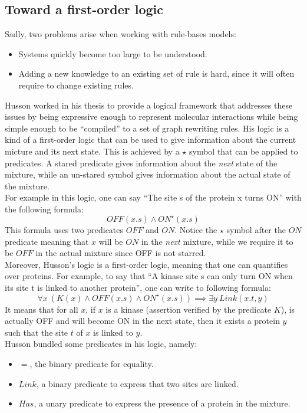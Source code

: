 \documentclass[10pt,a4paper]{article}
\begin{document}
\subsection{Toward a first-order logic}
 Sadly, two problems arise when working with rule-bases models:
\begin{itemize}
\item Systems quickly become too large to be understood.
\item Adding a new knowledge to an existing set of rule is hard, since it will often require to change existing rules.
\end{itemize}

Husson worked in his thesis\cite{husson} to provide a logical framework that addresses these
issues by being expressive enough to represent molecular interactions while being simple enough to be ``compiled'' to a set of graph rewriting rules. His logic is a kind of a first-order logic that can be used to give information about the current micture and its next state. This is achieved by a $\star$ symbol that can be applied to predicates. A stared predicate gives information about the \emph{next} state of the mixture, while an un-stared symbol gives information about the actual state of the mixture.\\

For example in this logic, one can say ``The site s of the protein x turns ON'' with the following formula:
$$ OFF(x.s) \land ON^\star(x.s) $$
This formula uses two predicates $OFF$ and $ON$. Notice the $\star$ symbol after the $ON$ predicate meaning that $x$ will be $ON$ in the \emph{next} mixture, while we require it to be $OFF$ in the actual mixture since OFF is not starred.\\

Moreover, Husson's logic is a first-order logic, meaning that one can quantifies over proteins. For example, to say that ``A kinase site s can only turn ON when its site t is linked to another protein'', one can write to following formula:
$$ \forall x\ (K(x) \land OFF(x.s) \land ON^\star(x.s)) \implies \exists y\ Link(x.t,y) $$
It means that for all $x$, if $x$ is a kinase (assertion verified by the predicate $K$), is actually OFF and will become ON in the next state, then it exists a protein $y$ such that the site $t$ of $x$ is linked to $y$.\\

Husson bundled some predicates in his logic, namely:
\begin{itemize}
\item $=$, the binary predicate for equality.
\item $Link$, a binary predicate to express that two sites are linked.
\item $Has$, a unary predicate to express the presence of a protein in the mixture.
\end{itemize}
\end{document}
